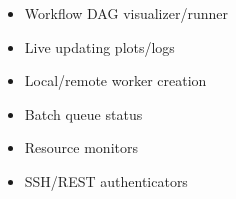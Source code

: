 \documentclass{tikzposter}
\providecommand{\tightlist}{%
  \setlength{\itemsep}{0pt}\setlength{\parskip}{0pt}}
\begin{document}
\begin{columns}
{%
% 
% 
% 
% 
% 
% 
% 
% 
}
% 
% 
% 

 {
\begin{itemize}
\tightlist
\item
  Workflow DAG visualizer/runner
\item
  Live updating plots/logs
  \item Local/remote worker creation
\item
  Batch queue status
\item
  Resource monitors
\item
  SSH/REST authenticators

\end{itemize}
}

\end{columns}
\end{document}
